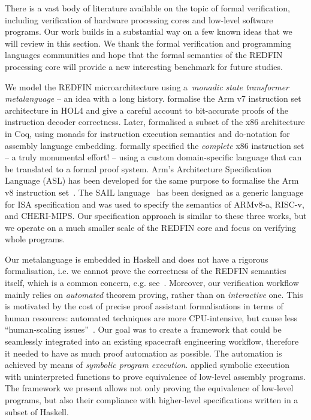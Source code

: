 There is a vast body of literature available on the topic of formal verification,
including verification of hardware processing cores and low-level software programs.
Our work builds in a substantial way on a few known ideas that we will review in
this section. We thank the formal verification and programming languages
communities and hope that the formal semantics of the REDFIN processing core
will provide a new interesting benchmark for future studies.

We model the REDFIN microarchitecture using a~\emph{monadic state transformer
metalanguage} -- an idea with a long history.
\citet{fox2010trustworthy} formalise the Arm v7 instruction
set architecture in HOL4 and give a careful account to bit-accurate proofs of
the instruction decoder correctness. Later, \citet{kennedy2013coq}
formalised a subset of the x86 architecture in Coq, using monads for instruction
execution semantics and \textsf{do}-notation for assembly language embedding.
\citet{degenbaev2012formal} formally specified the \emph{complete} x86
instruction set -- a truly monumental effort! -- using a custom domain-specific
language that can be translated to a formal proof system. Arm's Architecture
Specification Language (ASL) has been developed for the same purpose to formalise the
Arm v8 instruction set~\cite{reid2016cav}. The SAIL language~\cite{SAIL-lang} has
been designed as a generic language for ISA specification and was used to
specify the semantics of ARMv8-a, RISC-v, and CHERI-MIPS.
Our specification approach is similar to these three works, but we operate on a
much smaller scale of the REDFIN core and focus on verifying whole programs.

Our metalanguage is embedded in Haskell and does not have a rigorous
formalisation, i.e. we cannot prove the correctness of the REDFIN semantics
itself, which is a common concern, e.g. see~\cite{reid2017oopsla}. Moreover, our
verification workflow mainly relies on \emph{automated} theorem proving, rather
than on \emph{interactive} one. This is motivated by the cost of precise proof
assistant formalisations in terms of human resources: automated techniques are
more CPU-intensive, but cause less ``human-scaling issues''~\cite{reid2016cav}.
Our goal was to create a framework that could be seamlessly
integrated into an existing spacecraft engineering workflow, therefore it needed
to have as much proof automation as possible. The automation is achieved by means
of \emph{symbolic program execution}. \citet{Currie2006} applied
symbolic execution with uninterpreted functions to prove equivalence of low-level
assembly programs. The framework we present allows not only proving the
equivalence of low-level programs, but also their compliance with higher-level
specifications written in a subset of Haskell.

